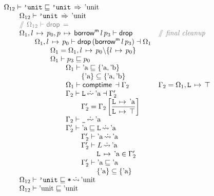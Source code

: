 \documentclass[12pt,twoside]{report}
\begin{document}
{\[\begin{array}{lll}
    \Omega_{12} \vdash \mono{'unit} \subtype \mono{'unit} \movearrowabs \atom{unit} \\
    \otab\Omega_{12} \vdash \mono{'unit} \movearrowabs \atom{unit} \\
    \otab\ocomment{$\Omega_{12} \vdash \drop{} =$} \\
    \otab\Omega_1,\absmap{l}{p_0},\absmap{p}{\borrowm{l}{p_3}} \vdash \drop{} &
      \ocomment{final cleanup} \\
    \otab\otab \Omega_1,\absmap{l}{p_0} \vdash \drop{(\borrowm{l}{p_3})} \dashv \Omega_1 \\
    \otab\otab\otab \Omega_1 = \Omega_1,\absmap{l}{p_0} \backslash \{ \absmap{l}{p_0} \} \\
    \otab\otab\otab \Omega_1 \vdash p_3 \subtype p_0 \\
    \otab\otab\otab\otab \Omega_1 \vdash \atom{a} \subtype \{\atom{a}, \atom{b}\} \\
    \otab\otab\otab\otab\otab \{\atom{a}\} \subseteq \{\atom{a}, \atom{b}\} \\
    \otab\otab\otab\otab \Omega_1 \vdash \comptime{} \dashv \Gamma_2 &
      \Gamma_2 = \Omega_1,\absmapm{L}{\top} \\
    \otab\otab\otab\otab \Gamma_2 \vdash \mono{L} \erasedwritearrow \atom{a} \dashv \Gamma_2' \\
    \otab\otab\otab\otab\otab \Gamma_2' = \Gamma_2\left[\dfrac{\absmapm{L}{\atom{a}}}{\absmapm{L}{\top}}\right] \\
    \otab\otab\otab\otab \Gamma_2 \vdash \mono{\_} \erasedwritearrow \atom{a} \\
    \otab\otab\otab\otab \Gamma_2' \vdash \atom{a} \subtype \mono{L} \erasedreadarrow \atom{a} \\
    \otab\otab\otab\otab\otab \Gamma_2' \vdash \atom{a} \erasedreadarrow \atom{a} \\
    \otab\otab\otab\otab\otab \Gamma_2' \vdash L \erasedreadarrow \atom{a} \\
    \otab\otab\otab\otab\otab\otab \absmapm{L}{\atom{a}} \in \Gamma_2' \\
    \otab\otab\otab\otab\otab \Gamma_2' \vdash \atom{a} \subtype \atom{a} \\
    \otab\otab\otab\otab\otab\otab \{\atom{a}\} \subseteq \{\atom{a}\} \\
    \otab\Omega_{12} \vdash \mono{'unit} \subtype \mono{*} \erasedreadarrow \atom{unit} \\
    
    \otab \Omega_{12} \vdash \atom{unit} \subtype \atom{unit}
  \end{array}\]
}
\end{document}
